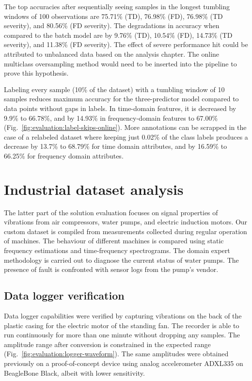 The top accuracies after sequentially seeing samples in the longest tumbling windows of 100 observations are 75.71\% (TD), 76.98\% (FD), 76.98\% (TD severity), and 80.56\% (FD severity). The degradations in accuracy when compared to the batch model are by 9.76\% (TD), 10.54\% (FD), 14.73\% (TD severity), and 11.38\% (FD severity). The effect of severe performance hit could be attributed to unbalanced data based on the analysis chapter. The online multiclass oversampling method would need to be inserted into the pipeline to prove this hypothesis.

Labeling every  sample (10\% of the dataset) with a tumbling window of 10 samples reduces maximum accuracy for the three-predictor model compared to data points without gaps in labels. In time-domain features, it is decreased by 9.9\% to 66.78\%, and by 14.93\% in frequency-domain features to 67.00\% (Fig.~\ref{fig:evaluation:label-skips-online}). More annotations can be scrapped in the case of a relabeled dataset where keeping just 0.02\% of the class labels produces a decrease by 13.7\% to 68.79\% for time domain attributes, and by 16.59\% to 66.25\% for frequency domain attributes.


\section{Industrial dataset analysis}
The latter part of the solution evaluation focuses on signal properties of vibrations from air compressors, water pumps, and electric induction motors. Our custom dataset is compiled from measurements collected during regular operation of machines. The behaviour of different machines is compared using static frequency estimations and time-frequency spectrograms. The domain expert methodology is carried out to diagnose the current status of water pumps. The presence of fault is confronted with sensor logs from the pump's vendor.

\subsection{Data logger verification}
Data logger capabilities were verified by capturing vibrations on the back of the plastic casing for the electric motor of the standing fan. The recorder is able to run continuously for more than one minute without dropping any samples. The amplitude range after conversion is constrained in the expected range (Fig.~\ref{fig:evaluation:logger-waveform}). The same amplitudes were obtained previously on a proof-of-concept device using analog accelerometer ADXL335 on BeagleBone Black, albeit with lower sensitivity.

